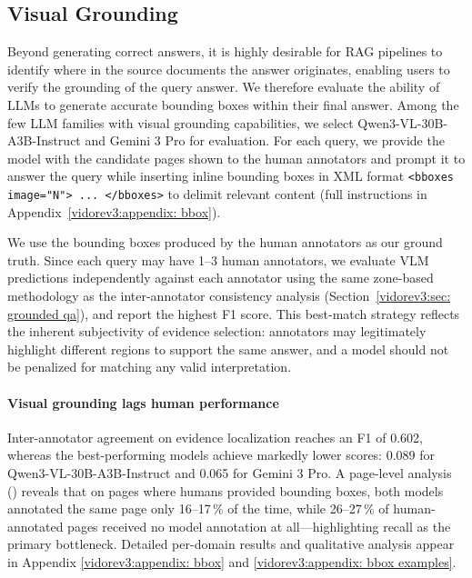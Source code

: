 \subsection{Visual Grounding} \label{vidorev3:sec:visual grounding results}

Beyond generating correct answers, it is highly desirable for RAG pipelines to identify where in the source documents the answer originates, enabling users to verify the grounding of the query answer. We therefore evaluate the ability of LLMs to generate accurate bounding boxes within their final answer. Among the few LLM families with visual grounding capabilities, we select Qwen3-VL-30B-A3B-Instruct and Gemini 3 Pro for evaluation. For each query, we provide the model with the candidate pages shown to the human annotators and prompt it to answer the query while inserting inline bounding boxes in XML format \texttt{<bboxes image="N"> ... </bboxes>} to delimit relevant content (full instructions in Appendix~\ref{vidorev3:appendix: bbox}).

We use the bounding boxes produced by the human annotators as our ground truth. Since each query may have 1--3 human annotators, we evaluate VLM predictions independently against each annotator using the same zone-based methodology as the inter-annotator consistency analysis (Section~\ref{vidorev3:sec: grounded qa}), and report the highest F1 score. This best-match strategy reflects the inherent subjectivity of evidence selection: annotators may legitimately highlight different regions to support the same answer, and a model should not be penalized for matching any valid interpretation.


\paragraph{Visual grounding lags human performance} 
Inter-annotator agreement on evidence localization reaches an F1 of 0.602, whereas the best-performing models achieve markedly lower scores: 0.089 for Qwen3-VL-30B-A3B-Instruct and 0.065 for Gemini 3 Pro. A page-level analysis () reveals that on pages where humans provided bounding boxes, both models annotated the same page only 16--17\,\% of the time, while 26--27\,\% of human-annotated pages received no model annotation at all—highlighting recall as the primary bottleneck. Detailed per-domain results and qualitative analysis appear in Appendix \ref{vidorev3:appendix: bbox} and \ref{vidorev3:appendix: bbox examples}.

